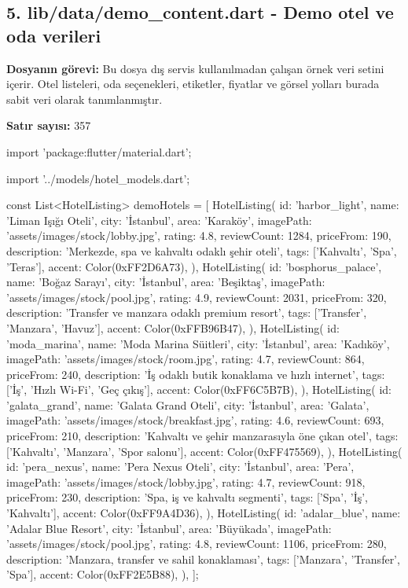 \documentclass[11pt,a4paper]{article}
\begin{document}
\clearpage
\subsection{5. lib/data/demo\_content.dart - Demo otel ve oda verileri}
\textbf{Dosyanın görevi:} Bu dosya dış servis kullanılmadan çalışan örnek veri setini içerir. Otel listeleri, oda seçenekleri, etiketler, fiyatlar ve görsel yolları burada sabit veri olarak tanımlanmıştır.

\textbf{Satır sayısı:} 357

\begin{codeblock}
import 'package:flutter/material.dart';

import '../models/hotel_models.dart';

const List<HotelListing> demoHotels = [
  HotelListing(
    id: 'harbor_light',
    name: 'Liman Işığı Oteli',
    city: 'İstanbul',
    area: 'Karaköy',
    imagePath: 'assets/images/stock/lobby.jpg',
    rating: 4.8,
    reviewCount: 1284,
    priceFrom: 190,
    description: 'Merkezde, spa ve kahvaltı odaklı şehir oteli',
    tags: ['Kahvaltı', 'Spa', 'Teras'],
    accent: Color(0xFF2D6A73),
  ),
  HotelListing(
    id: 'bosphorus_palace',
    name: 'Boğaz Sarayı',
    city: 'İstanbul',
    area: 'Beşiktaş',
    imagePath: 'assets/images/stock/pool.jpg',
    rating: 4.9,
    reviewCount: 2031,
    priceFrom: 320,
    description: 'Transfer ve manzara odaklı premium resort',
    tags: ['Transfer', 'Manzara', 'Havuz'],
    accent: Color(0xFFB96B47),
  ),
  HotelListing(
    id: 'moda_marina',
    name: 'Moda Marina Süitleri',
    city: 'İstanbul',
    area: 'Kadıköy',
    imagePath: 'assets/images/stock/room.jpg',
    rating: 4.7,
    reviewCount: 864,
    priceFrom: 240,
    description: 'İş odaklı butik konaklama ve hızlı internet',
    tags: ['İş', 'Hızlı Wi-Fi', 'Geç çıkış'],
    accent: Color(0xFF6C5B7B),
  ),
  HotelListing(
    id: 'galata_grand',
    name: 'Galata Grand Oteli',
    city: 'İstanbul',
    area: 'Galata',
    imagePath: 'assets/images/stock/breakfast.jpg',
    rating: 4.6,
    reviewCount: 693,
    priceFrom: 210,
    description: 'Kahvaltı ve şehir manzarasıyla öne çıkan otel',
    tags: ['Kahvaltı', 'Manzara', 'Spor salonu'],
    accent: Color(0xFF475569),
  ),
  HotelListing(
    id: 'pera_nexus',
    name: 'Pera Nexus Oteli',
    city: 'İstanbul',
    area: 'Pera',
    imagePath: 'assets/images/stock/lobby.jpg',
    rating: 4.7,
    reviewCount: 918,
    priceFrom: 230,
    description: 'Spa, iş ve kahvaltı segmenti',
    tags: ['Spa', 'İş', 'Kahvaltı'],
    accent: Color(0xFF9A4D36),
  ),
  HotelListing(
    id: 'adalar_blue',
    name: 'Adalar Blue Resort',
    city: 'İstanbul',
    area: 'Büyükada',
    imagePath: 'assets/images/stock/pool.jpg',
    rating: 4.8,
    reviewCount: 1106,
    priceFrom: 280,
    description: 'Manzara, transfer ve sahil konaklaması',
    tags: ['Manzara', 'Transfer', 'Spa'],
    accent: Color(0xFF2E5B88),
  ),
];


\end{codeblock}
\end{document}
